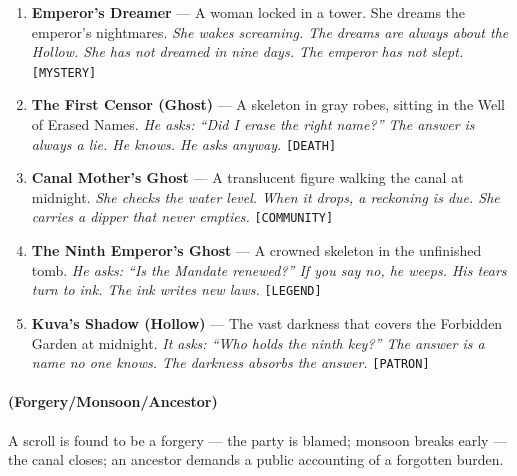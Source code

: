 \begin{enumerate}
\item \textbf{Emperor's Dreamer} --- A woman locked in a tower. She dreams the emperor's nightmares.
  \hfill \textit{She wakes screaming. The dreams are always about the Hollow. She has not dreamed in nine days. The emperor has not slept.} \texttt{[MYSTERY]}
\item[\card{\heartsuit}{J}] \textbf{The First Censor (Ghost)} --- A skeleton in gray robes, sitting in the Well of Erased Names.
  \hfill \textit{He asks: ``Did I erase the right name?'' The answer is always a lie. He knows. He asks anyway.} \texttt{[DEATH]}
\item[\card{\heartsuit}{Q}] \textbf{Canal Mother's Ghost} --- A translucent figure walking the canal at midnight.
  \hfill \textit{She checks the water level. When it drops, a reckoning is due. She carries a dipper that never empties.} \texttt{[COMMUNITY]}
\item[\card{\heartsuit}{K}] \textbf{The Ninth Emperor's Ghost} --- A crowned skeleton in the unfinished tomb.
  \hfill \textit{He asks: ``Is the Mandate renewed?'' If you say no, he weeps. His tears turn to ink. The ink writes new laws.} \texttt{[LEGEND]}
\item[\card{\heartsuit}{A}] \textbf{Kuva's Shadow (Hollow)} --- The vast darkness that covers the Forbidden Garden at midnight.
  \hfill \textit{It asks: ``Who holds the ninth key?'' The answer is a name no one knows. The darkness absorbs the answer.} \texttt{[PATRON]}
\end{enumerate}

\paragraph*{(Forgery/Monsoon/Ancestor)} A scroll is found to be a forgery --- the party is blamed; monsoon breaks early --- the canal closes; an ancestor demands a public accounting of a forgotten burden.

